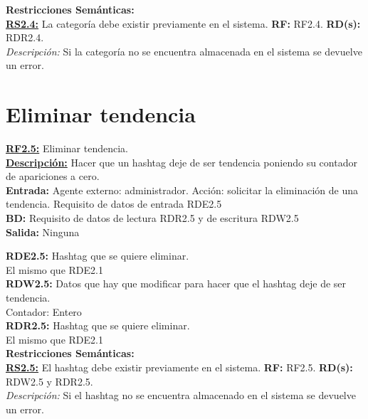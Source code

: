 \textbf{\textcolor{verde}{Restricciones Semánticas:}} \\[6pt]
\textbf{\textcolor{verde}{\underline{RS2.4:}}} La categoría debe existir previamente en el sistema. \textbf{RF:} RF2.4. \textbf{RD(s):} RDR2.4. \\
\hspace*{1cm} \textit{Descripción:} Si la categoría no se encuentra almacenada en el sistema se devuelve un error. \\[6pt]

\pagebreak

\section{Eliminar tendencia}
\textbf{\textcolor{rojo}{\underline{RF2.5:}}} Eliminar tendencia. \\[6pt]

\textbf{\textcolor{rojo}{\underline{Descripción:}}} Hacer que un hashtag deje de ser tendencia poniendo su contador de apariciones a cero.\\[6pt]

\textbf{\textcolor{rojo}{Entrada:}} Agente externo: administrador. Acción: solicitar la eliminación de una tendencia. 
Requisito de datos de entrada \textcolor{azul}{RDE2.5} \\[6pt]

\textbf{\textcolor{rojo}{BD:}} Requisito de datos de lectura \textcolor{azul}{RDR2.5} y de escritura \textcolor{azul}{RDW2.5}\\[6pt]

\textbf{\textcolor{rojo}{Salida:}} Ninguna

\textcolor{azul}{\textbf{RDE2.5:}} Hashtag que se quiere eliminar. \\
\hspace*{1cm} El mismo que \textcolor{azul}{RDE2.1}\\

\textcolor{azul}{\textbf{RDW2.5:}} Datos que hay que modificar para hacer que el hashtag deje de ser tendencia. \\
\hspace*{1cm} Contador: Entero\\[12pt]

\textcolor{azul}{\textbf{RDR2.5:}} Hashtag que se quiere eliminar. \\
\hspace*{1cm} El mismo que \textcolor{azul}{RDE2.1}\\

\textbf{\textcolor{verde}{Restricciones Semánticas:}} \\[6pt]
\textbf{\textcolor{verde}{\underline{RS2.5:}}} El hashtag debe existir previamente en el sistema. \textbf{RF:} RF2.5. \textbf{RD(s):} RDW2.5 y RDR2.5. \\
\hspace*{1cm} \textit{Descripción:} Si el hashtag no se encuentra almacenado en el sistema se devuelve un error. \\[6pt]

\pagebreak

